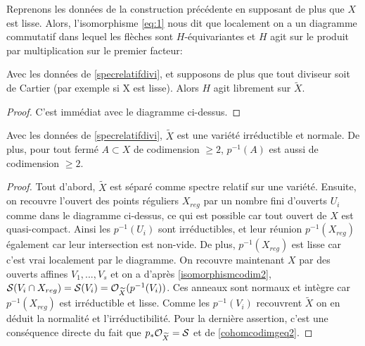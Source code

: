 \begin{rem}\label{lisseGoodQuotient}
Reprenons les données de la construction précédente en supposant de plus que $X$ est lisse. Alors, l'isomorphisme \ref{eq:1} nous dit que localement on a un diagramme commutatif dans lequel les flèches sont $H$-équivariantes et $H$ agit sur le produit par multiplication sur le premier facteur:
\begin{center}
\end{center}
\end{rem}


\begin{prop}
Avec les données de \ref{specrelatifdivi}, et supposons de plus que tout diviseur soit de Cartier (par exemple si X est lisse). Alors $H$ agit librement sur $\widetilde{X}$.
\end{prop}
\begin{proof}
C'est immédiat avec le diagramme ci-dessus.
\end{proof}


\begin{prop}\label{preimagecodim2}
Avec les données de \ref{specrelatifdivi}, $\widetilde{X}$ est une variété irréductible et normale. De plus, pour tout fermé $A\subset X$ de codimension $\geq 2$, $p^{-1}(A)$ est aussi de codimension $\geq 2$.
\end{prop}
\begin{proof}
Tout d'abord, $\widetilde{X}$ est séparé comme spectre relatif sur une variété. Ensuite, on recouvre l'ouvert des points réguliers $X_{reg}$ par un nombre fini d'ouverts $U_i$ comme dans le diagramme ci-dessus, ce qui est possible car tout ouvert de $X$ est quasi-compact. Ainsi les $p^{-1}(U_i)$ sont irréductibles, et leur réunion $p^{-1}(X_{reg})$ également car leur intersection est non-vide. De plus, $p^{-1}(X_{reg})$ est lisse car c'est vrai localement par le diagramme. On recouvre maintenant $X$ par des ouverts affines $V_1,...,V_s$ et on a d'après \ref{isomorphismcodim2}, $\mathcal{S}(V_i\cap X_{reg})=\mathcal{S}(V_i)=\mathcal{O}_{\widetilde{X}}(p^{-1}(V_i))$. Ces anneaux sont normaux et intègre car $p^{-1}(X_{reg})$ est irréductible et lisse. Comme les $p^{-1}(V_i)$ recouvrent $\widetilde{X}$ on en déduit la normalité et l'irréductibilité.
Pour la dernière assertion, c'est une conséquence directe du fait que $p_*\mathcal{O}_{\widetilde{X}}=\mathcal{S}$ et de \ref{cohomcodimgeq2}.
\end{proof}


